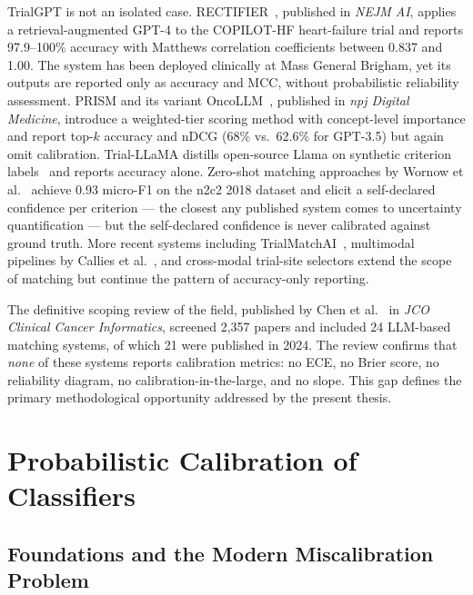 TrialGPT is not an isolated case. RECTIFIER~\cite{unlu2024rectifier}, 
published in \emph{NEJM AI}, applies a retrieval-augmented GPT-4 to 
the COPILOT-HF heart-failure trial and reports 97.9--100\% accuracy 
with Matthews correlation coefficients between 0.837 and 1.00. The 
system has been deployed clinically at Mass General Brigham, yet its 
outputs are reported only as accuracy and MCC, without probabilistic 
reliability assessment. PRISM and its variant 
OncoLLM~\cite{gupta2024oncollm}, published in \emph{npj Digital 
Medicine}, introduce a weighted-tier scoring method with concept-level 
importance and report top-$k$ accuracy and nDCG (68\% vs.\ 62.6\% for 
GPT-3.5) but again omit calibration. Trial-LLaMA distills open-source 
Llama on synthetic criterion labels~\cite{nievas2024triallama} and 
reports accuracy alone. Zero-shot matching approaches by Wornow et 
al.~\cite{wornow2024zeroshot} achieve 0.93 micro-F1 on the n2c2 2018 
dataset and elicit a self-declared confidence per criterion --- the 
closest any published system comes to uncertainty quantification --- 
but the self-declared confidence is never calibrated against ground 
truth. More recent systems including 
TrialMatchAI~\cite{abdallah2026trialmatchai}, multimodal pipelines by 
Callies et al.~\cite{callies2025multimodal}, and cross-modal trial-site 
selectors extend the scope of matching but continue the pattern of 
accuracy-only reporting.

The definitive scoping review of the field, published by Chen et 
al.~\cite{chen2025scoping} in \emph{JCO Clinical Cancer Informatics}, 
screened 2{,}357 papers and included 24 LLM-based matching systems, 
of which 21 were published in 2024. The review confirms that 
\emph{none} of these systems reports calibration metrics: no ECE, no 
Brier score, no reliability diagram, no calibration-in-the-large, and 
no slope. This gap defines the primary methodological opportunity 
addressed by the present thesis.

\section{Probabilistic Calibration of Classifiers}
\label{sec:sota-calibration}

\subsection{Foundations and the Modern Miscalibration Problem}
\label{subsec:sota-foundations}

